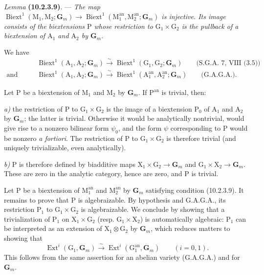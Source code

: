 \documentclass[11pt,leqno]{article}
\begin{document}
\textit{Lemma} \textbf{(10.2.3.9)}. — \textit{The map
\(\operatorname{Biext}^{1}(\mathrm{M}_1,\mathrm{M}_2;\mathbf{G}_m)
\to\operatorname{Biext}^{1}(\mathrm{M}_1^{\mathrm{an}},
\mathrm{M}_2^{\mathrm{an}};\mathbf{G}_m)\)
is injective. Its image consists of the biextensions \(\mathrm{P}\)
whose restriction to \(\mathrm{G}_1\times\mathrm{G}_2\) is the
pullback of a biextension of \(\mathrm{A}_1\) and
\(\mathrm{A}_2\) by \(\mathbf{G}_m\).}

We have
\begin{align*}
&\operatorname{Biext}^{1}(\mathrm{A}_1,\mathrm{A}_2;\mathbf{G}_m)
\xrightarrow{\sim}
\operatorname{Biext}^{1}(\mathrm{G}_1,\mathrm{G}_2;\mathbf{G}_m)
\qquad\text{(S.G.A. 7, VIII (3.5))}\\
\text{and}\qquad&
\operatorname{Biext}^{1}(\mathrm{A}_1,\mathrm{A}_2;\mathbf{G}_m)
\xrightarrow{\sim}
\operatorname{Biext}^{1}(\mathrm{A}_1^{\mathrm{an}},
\mathrm{A}_2^{\mathrm{an}};\mathbf{G}_m)
\qquad\text{(G.A.G.A.).}
\end{align*}

Let \(\mathrm{P}\) be a biextension of \(\mathrm{M}_1\) and
\(\mathrm{M}_2\) by \(\mathbf{G}_m\). If
\(\mathrm{P}^{\mathrm{an}}\) is trivial, then:

\textit{a)} the restriction of \(\mathrm{P}\) to
\(\mathrm{G}_1\times\mathrm{G}_2\) is the image of a biextension
\(\mathrm{P}_0\) of \(\mathrm{A}_1\) and \(\mathrm{A}_2\) by
\(\mathbf{G}_m\); the latter is trivial. Otherwise it would be
analytically nontrivial, would give rise to a nonzero bilinear
form \(\psi_0\), and the form \(\psi\) corresponding to
\(\mathrm{P}\) would be nonzero \textit{a fortiori}. The restriction
of \(\mathrm{P}\) to \(\mathrm{G}_1\times\mathrm{G}_2\) is therefore
trivial (and uniquely trivializable, even analytically).

\textit{b)} \(\mathrm{P}\) is therefore defined by biadditive
maps \(\mathrm{X}_1\times\mathrm{G}_2\to\mathbf{G}_m\) and
\(\mathrm{G}_1\times\mathrm{X}_2\to\mathbf{G}_m\). These are
zero in the analytic category, hence are zero, and
\(\mathrm{P}\) is trivial.

Let \(\mathrm{P}\) be a biextension of
\(\mathrm{M}_1^{\mathrm{an}}\) and \(\mathrm{M}_2^{\mathrm{an}}\)
by \(\mathbf{G}_m\) satisfying condition (10.2.3.9).
It remains to prove that \(\mathrm{P}\) is algebraizable. By
hypothesis and G.A.G.A., its restriction \(\mathrm{P}_1\) to
\(\mathrm{G}_1\times\mathrm{G}_2\) is algebraizable. We conclude by showing
that a trivialization of \(\mathrm{P}_1\) on
\(\mathrm{X}_1\times\mathrm{G}_2\)
(resp. \(\mathrm{G}_1\times\mathrm{X}_2\)) is automatically
algebraic: \(\mathrm{P}_1\) can be interpreted as an extension of
\(\mathrm{X}_1\otimes\mathrm{G}_2\) by \(\mathbf{G}_m\), which
reduces matters to showing that
\[
\operatorname{Ext}^{i}(\mathrm{G}_1,\mathbf{G}_m)
\xrightarrow{\sim}
\operatorname{Ext}^{i}(\mathrm{G}_1^{\mathrm{an}},\mathbf{G}_m)
\qquad(i=0,1).
\]
This follows from the same assertion for an abelian variety
(G.A.G.A.) and for \(\mathbf{G}_m\).
\end{document}
